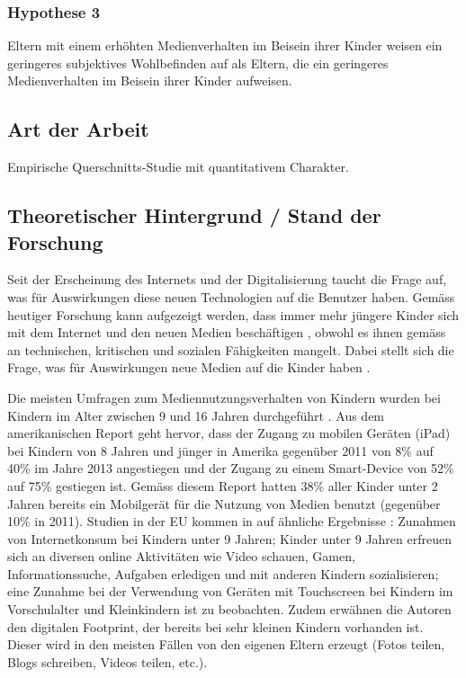 \subsubsection{Hypothese 3}
Eltern mit einem erhöhten Medienverhalten im Beisein ihrer Kinder weisen ein geringeres subjektives Wohlbefinden auf als Eltern, die ein geringeres Medienverhalten im Beisein ihrer Kinder aufweisen.
\subsection{Art der Arbeit}
Empirische Querschnitts-Studie mit quantitativem Charakter.

\subsection{Theoretischer Hintergrund / Stand der Forschung}
Seit der Erscheinung des Internets und der Digitalisierung taucht die Frage auf, was für Auswirkungen diese neuen Technologien auf die Benutzer haben. Gemäss heutiger Forschung kann aufgezeigt werden, dass immer mehr jüngere Kinder sich mit dem Internet und den neuen Medien beschäftigen \cite{Rideout2013a, Chaudron2015}, obwohl es ihnen gemäss  an technischen, kritischen und sozialen Fähigkeiten mangelt. Dabei stellt sich die Frage, was für Auswirkungen neue Medien auf die Kinder haben \cite{Tomopoulos2010, Pempek2014, Livingstone2015, Masur2015, Troseth2016}. 

Die meisten Umfragen zum Mediennutzungsverhalten von Kindern wurden bei Kindern im Alter zwischen 9 und 16 Jahren durchgeführt \cite{Chaudron2015}. Aus dem amerikanischen Report  geht hervor, dass der Zugang zu mobilen Geräten (iPad) bei Kindern von 8 Jahren und jünger in Amerika gegenüber 2011 von 8\% auf 40\% im Jahre 2013 angestiegen und der Zugang zu einem Smart-Device von 52\% auf 75\% gestiegen ist. Gemäss diesem Report hatten 38\% aller Kinder unter 2 Jahren bereits ein Mobilgerät für die Nutzung von Medien benutzt (gegenüber 10\% in 2011). Studien in der EU kommen in auf ähnliche Ergebnisse \cite{Holloway2013}: Zunahmen von Internetkonsum bei Kindern unter 9 Jahren; Kinder unter 9 Jahren erfreuen sich an diversen online Aktivitäten wie Video schauen, Gamen, Informationssuche, Aufgaben erledigen und mit anderen Kindern sozialisieren; eine Zunahme bei der Verwendung von Geräten mit Touchscreen bei Kindern im Vorschulalter und Kleinkindern ist zu beobachten. Zudem erwähnen die Autoren den digitalen Footprint, der bereits bei sehr kleinen Kindern vorhanden ist. Dieser wird in den meisten Fällen von den eigenen Eltern erzeugt (Fotos teilen, Blogs schreiben, Videos teilen, etc.).

